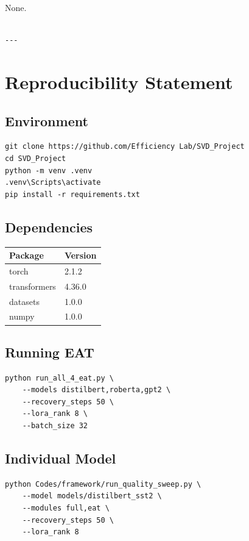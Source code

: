 None.
\begin{lstlisting}

---
\end{lstlisting}


\section{Reproducibility Statement}

\subsection{Environment}

\begin{lstlisting}
git clone https://github.com/Efficiency Lab/SVD_Project
cd SVD_Project
python -m venv .venv
.venv\Scripts\activate
pip install -r requirements.txt
\end{lstlisting}

\subsection{Dependencies}

\begin{table}[H]
\centering
\small
\begin{tabular}{ll}
\toprule
\textbf{Package} & \textbf{Version} \\
\midrule
torch & 2.1.2 \\
transformers & 4.36.0 \\
datasets & 1.0.0 \\
numpy & 1.0.0 \\
\bottomrule
\end{tabular}
\end{table}

\subsection{Running EAT}

\begin{lstlisting}
python run_all_4_eat.py \
    --models distilbert,roberta,gpt2 \
    --recovery_steps 50 \
    --lora_rank 8 \
    --batch_size 32
\end{lstlisting}

\subsection{Individual Model}

\begin{lstlisting}
python Codes/framework/run_quality_sweep.py \
    --model models/distilbert_sst2 \
    --modules full,eat \
    --recovery_steps 50 \
    --lora_rank 8
\end{lstlisting}

